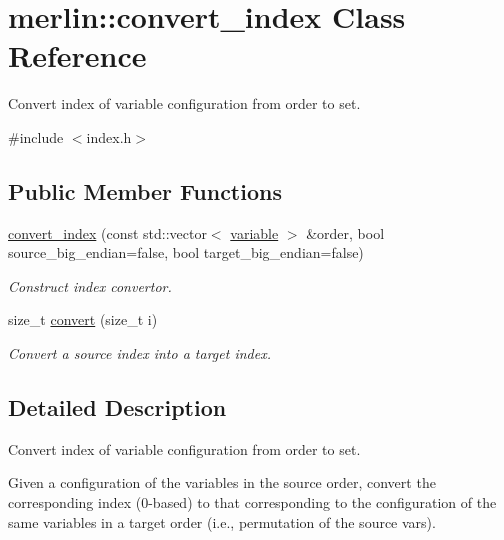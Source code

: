 \hypertarget{classmerlin_1_1convert__index}{}\section{merlin\+:\+:convert\+\_\+index Class Reference}
\label{classmerlin_1_1convert__index}


Convert index of variable configuration from order to set.  




{\ttfamily \#include $<$index.\+h$>$}

\subsection*{Public Member Functions}
\begin{DoxyCompactItemize}
\item 
\hyperlink{classmerlin_1_1convert__index_a89ab4e590bfceb566d537b54d5dc20da}{convert\+\_\+index} (const std\+::vector$<$ \hyperlink{classmerlin_1_1variable}{variable} $>$ \&order, bool source\+\_\+big\+\_\+endian=false, bool target\+\_\+big\+\_\+endian=false)
\begin{DoxyCompactList}\small\item\em Construct index convertor. \end{DoxyCompactList}\item 
size\+\_\+t \hyperlink{classmerlin_1_1convert__index_a34bc5f53325d82858068f2c59d6d29b1}{convert} (size\+\_\+t i)\hypertarget{classmerlin_1_1convert__index_a34bc5f53325d82858068f2c59d6d29b1}{}\label{classmerlin_1_1convert__index_a34bc5f53325d82858068f2c59d6d29b1}

\begin{DoxyCompactList}\small\item\em Convert a source index into a target index. \end{DoxyCompactList}\end{DoxyCompactItemize}


\subsection{Detailed Description}
Convert index of variable configuration from order to set. 

Given a configuration of the variables in the source order, convert the corresponding index (0-\/based) to that corresponding to the configuration of the same variables in a target order (i.\+e., permutation of the source vars). 

